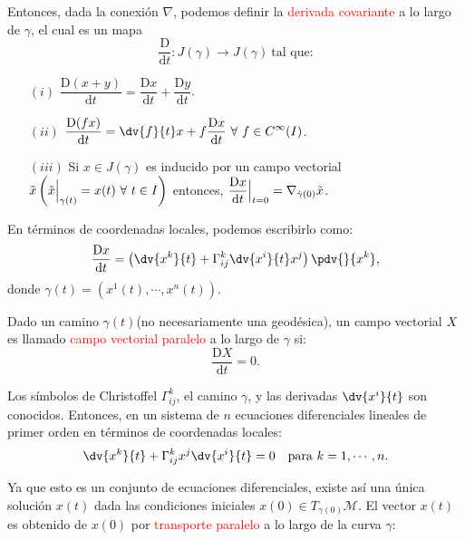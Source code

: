 \documentclass[../main]{subfiles}
\begin{document}
\begin{adjustwidth}{0pt}{-100pt}
Entonces, dada la conexión $\nabla$, podemos definir la \textcolor{red}{derivada covariante} a lo largo de $\gamma$, el cual es un mapa 
\begin{equation}
    \dfrac{\mathrm{D}}{\mathrm{d}t}: J(\gamma)\rightarrow J(\gamma) \ \text{tal que:}
\end{equation}
\begin{enumerate}
    \item[$(i)$] $\displaystyle \dfrac{\mathrm{D} (x+y)}{\mathrm{d}t}=\dfrac{\mathrm{D}x}{\mathrm{d}t}+\dfrac{\mathrm{D}y}{\mathrm{d}t}$.
    \item[$(ii)$] $\displaystyle \dfrac{\mathrm{D}(fx)}{\mathrm{d}t}=\dv{f}{t}x+f\dfrac{\mathrm{D}x}{\mathrm{d}t} \ \forall \ f\in C^{\infty}(I)$.
    \item[$(iii)$] Si $x \in J(\gamma)$ es inducido por un campo vectorial $\displaystyle \tilde{x}\left(\tilde{x}\Big{|}_{\gamma(t)}=x(t) \ \forall \ t\in I\right)$ entonces, $\displaystyle \dfrac{\mathrm{D}x}{\mathrm{d}t}\Big{|}_{t=0}=\nabla_{\dot{\gamma}(0)}\tilde{x}$.   
\end{enumerate}

En términos de coordenadas locales, podemos escribirlo como:
\begin{equation}
    \dfrac{\mathrm{D}x}{\mathrm{d}t}=\left(\dv{x^k}{t}+\Gamma^k_{ij}\dv{x^{i}}{t}x^j\right)\pdv{}{x^k},
\end{equation}
donde $\gamma(t)=(x^1(t), \cdots, x^n(t))$.

Dado un camino $\gamma(t)$(no necesariamente una geodésica), un campo vectorial $X$ es llamado \textcolor{red}{campo vectorial paralelo} a lo largo de $\gamma$ si:
\begin{equation}
    \dfrac{\mathrm{D}X}{\mathrm{d}t}=0.
\end{equation}

Los símbolos de Christoffel $\Gamma^k_{ij}$, el camino $\gamma$, y las derivadas $\dv{x^{i}}{t}$ son conocidos. Entonces, en un sistema de $n$ ecuaciones diferenciales lineales de primer orden en términos de coordenadas locales:
\begin{equation}
    \dv{x^k}{t}+\Gamma^k_{ij}x^j \dv{x^{i}}{t}=0 \quad \text{para} \ k=1, \cdots, n.
\end{equation}

Ya que esto es un conjunto de ecuaciones diferenciales, existe así una única solución $x(t)$ dada las condiciones iniciales $x(0) \in T_{\gamma(0)}\mathcal{M}$. El vector $x(t)$ es obtenido de $x(0)$ por \textcolor{red}{transporte paralelo} a lo largo de la curva $\gamma$:


\end{adjustwidth}
\end{document}
